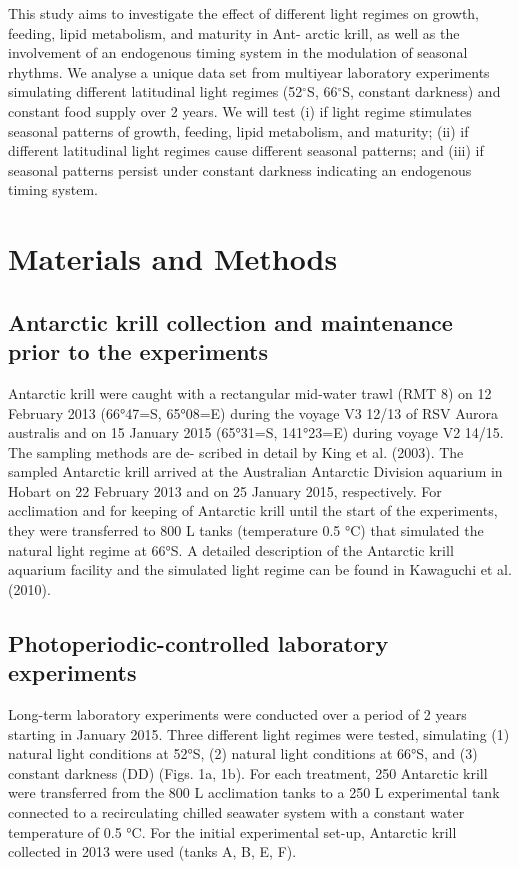 This study aims to investigate the effect of different light regimes on growth, feeding, lipid metabolism, and maturity in Ant- arctic krill, as well as the involvement of an endogenous timing system in the modulation of seasonal rhythms. We analyse a unique data set from multiyear laboratory experiments simulating different latitudinal light regimes (52$^{\circ}$S, 66$^{\circ}$S, constant darkness) and constant food supply over 2 years. We will test (i) if light regime stimulates seasonal patterns of growth, feeding, lipid metabolism, and maturity; (ii) if different latitudinal light regimes cause different seasonal patterns; and (iii) if seasonal patterns persist under constant darkness indicating an endogenous timing system. 
 
\section{Materials and Methods}

\subsection{Antarctic krill collection and maintenance prior to the experiments}

Antarctic krill were caught with a rectangular mid-water trawl (RMT 8) on 12 February 2013 (66°47=S, 65°08=E) during the voyage V3 12/13 of RSV Aurora australis and on 15 January 2015 (65°31=S, 141°23=E) during voyage V2 14/15. The sampling methods are de- scribed in detail by King et al. (2003). The sampled Antarctic krill arrived at the Australian Antarctic Division aquarium in Hobart on 22 February 2013 and on 25 January 2015, respectively. For acclimation and for keeping of Antarctic krill until the start of the experiments, they were transferred to 800 L tanks (temperature 0.5 °C) that simulated the natural light regime at 66°S. A detailed description of the Antarctic krill aquarium facility and the simulated light regime can be found in Kawaguchi et al. (2010). 

\subsection{Photoperiodic-controlled laboratory experiments} 
Long-term laboratory experiments were conducted over a period of 2 years starting in January 2015. Three different light regimes were tested, simulating (1) natural light conditions at 52°S, (2) natural light conditions at 66°S, and (3) constant darkness (DD) (Figs. 1a, 1b). For each treatment, 250 Antarctic krill were transferred from the 800 L acclimation tanks to a 250 L experimental tank connected to a recirculating chilled seawater system with a constant water temperature of 0.5 °C. For the initial experimental set-up, Antarctic krill collected in 2013 were used (tanks A, B, E, F). 

